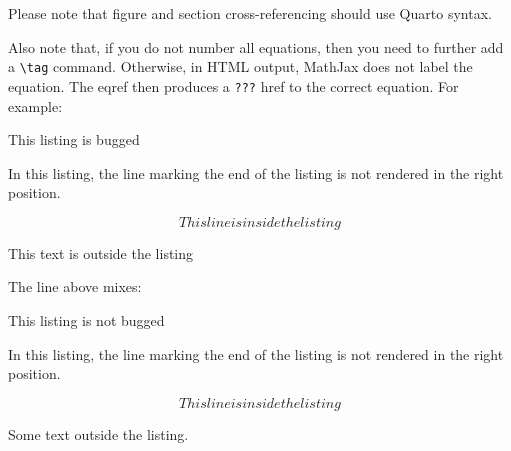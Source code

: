 \documentclass[
  letterpaper,
  DIV=11,
  numbers=noendperiod]{scrartcl}
\newcommand{\VERB}{\Verb[commandchars=\\\{\}]}
\newenvironment{Shaded}{\begin{snugshade}}{\end{snugshade}}
\newcommand{\AttributeTok}[1]{\textcolor[rgb]{0.40,0.45,0.13}{#1}}
\newcommand{\NormalTok}[1]{\textcolor[rgb]{0.00,0.23,0.31}{#1}}
\newcommand{\SpecialStringTok}[1]{\textcolor[rgb]{0.13,0.47,0.30}{#1}}
\providecommand{\tightlist}{%
  \setlength{\itemsep}{0pt}\setlength{\parskip}{0pt}}\usepackage{longtable,booktabs,array}
\theoremstyle{plain}
\theoremstyle{remark}
\begin{document}
Please note that figure and section cross-referencing should use Quarto
syntax.

Also note that, if you do not number all equations, then you need to
further add a \texttt{\textbackslash{}tag} command. Otherwise, in HTML
output, MathJax does not label the equation. The eqref then produces a
\texttt{???} href to the correct equation. For example:

\begin{codelisting}

\caption{This listing is bugged}

\hypertarget{lst-bugged-listing}{%
\label{lst-bugged-listing}}%
\begin{Shaded}
\begin{Highlighting}[]
\NormalTok{In this listing, the line marking}
\NormalTok{the end of the listing is not rendered}
\NormalTok{in the right position.}

\SpecialStringTok{$$ This line is inside the listing $$}
\end{Highlighting}
\end{Shaded}

\end{codelisting}

This text is outside the listing

The line above mixes:


\begin{codelisting}

\caption{This listing is not bugged}

\hypertarget{lst-bugged-listing2}{%
\label{lst-bugged-listing2}}%
\begin{Shaded}
\begin{Highlighting}[]
\NormalTok{In this listing, the line marking}
\NormalTok{the end of the listing is not rendered}
\NormalTok{in the right position.}

\SpecialStringTok{$$ This line is inside the listing $$}
\end{Highlighting}
\end{Shaded}

\end{codelisting}

Some text outside the listing.
\end{document}
